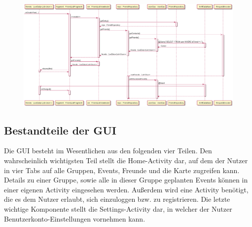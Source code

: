 \documentclass[parskip=full,11pt]{scrartcl}
\begin{document}
\begin{figure}
    \centering
    \includegraphics[width = \paperheight / 3 * 2, angle = -90]{datafetch.png}
	\label{fig:datafetch}
\end{figure}

%

\subsection{Bestandteile der GUI}

Die GUI besteht im Wesentlichen aus den folgenden vier Teilen. Den
wahrscheinlich wichtigsten Teil stellt die Home-Activity dar, auf dem der
Nutzer in vier Tabs auf alle Gruppen, Events, Freunde und die Karte zugreifen
kann. Details zu einer Gruppe, sowie alle in dieser Gruppe geplanten Events
können in einer eigenen Activity eingesehen werden. Außerdem wird eine Activity
benötigt, die es dem Nutzer erlaubt, sich einzuloggen bzw. zu registrieren.
Die letzte wichtige Komponente stellt die Settings-Activity dar, in welcher
der Nutzer Benutzerkonto-Einstellungen vornehmen kann.
\end{document}
